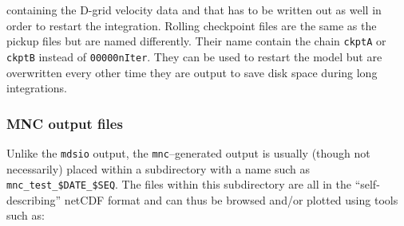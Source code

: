 containing the D-grid velocity data and that has to be written out as well
in order to restart the integration. Rolling checkpoint files are the same
as the pickup files but are named differently. Their name contain the chain 
\texttt{ckptA} or \texttt{ckptB} instead of \texttt{00000nIter}. They can be
used to restart the model but are overwritten every other time they are
output to save disk space during long integrations.



\subsubsection{MNC output files}

Unlike the \texttt{mdsio} output, the \texttt{mnc}--generated output
is usually (though not necessarily) placed within a subdirectory with
a name such as \texttt{mnc\_test\_\${DATE}\_\${SEQ}}.  The files
within this subdirectory are all in the ``self-describing'' netCDF
format and can thus be browsed and/or plotted using tools such as:
